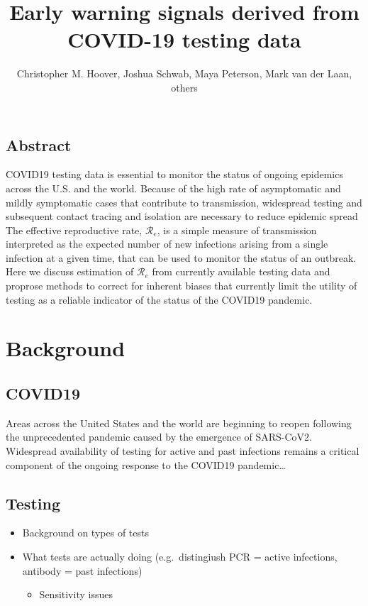 \documentclass[]{article}
\title{Early warning signals derived from COVID-19 testing data}
\author{Christopher M. Hoover, Joshua Schwab, Maya Peterson, Mark van der Laan,
others}
\date{}
\providecommand{\tightlist}{%
  \setlength{\itemsep}{0pt}\setlength{\parskip}{0pt}}
\begin{document}
\maketitle

\hypertarget{abstract}{%
\subsection{Abstract}\label{abstract}}

COVID19 testing data is essential to monitor the status of ongoing
epidemics across the U.S. and the world. Because of the high rate of
asymptomatic and mildly symptomatic cases that contribute to
transmission, widespread testing and subsequent contact tracing and
isolation are necessary to reduce epidemic spread The effective
reproductive rate, \(\mathcal{R}_e\), is a simple measure of
transmission interpreted as the expected number of new infections
arising from a single infection at a given time, that can be used to
monitor the status of an outbreak. Here we discuss estimation of
\(\mathcal{R}_e\) from currently available testing data and proprose
methods to correct for inherent biases that currently limit the utility
of testing as a reliable indicator of the status of the COVID19
pandemic.

\hypertarget{background}{%
\section{Background}\label{background}}

\hypertarget{covid19}{%
\subsection{COVID19}\label{covid19}}

Areas across the United States and the world are beginning to reopen
following the unprecedented pandemic caused by the emergence of
SARS-CoV2. Widespread availability of testing for active and past
infections remains a critical component of the ongoing response to the
COVID19 pandemic\ldots{}

\hypertarget{testing}{%
\subsection{Testing}\label{testing}}

\begin{itemize}
\tightlist
\item
  Background on types of tests\\
\item
  What tests are actually doing (e.g.~distingiush PCR = active
  infections, antibody = past infections)

  \begin{itemize}
  \tightlist
  \item
    Sensitivity issues
  \end{itemize}
\end{itemize}
\end{document}
